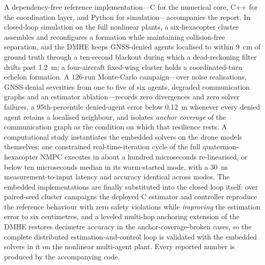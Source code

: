 A dependency-free reference implementation---C for the numerical core, C++ for
the coordination layer, and Python for simulation---accompanies the report. In
closed-loop simulation on the full nonlinear plants, a six-hexacopter cluster
assembles and reconfigures a formation while maintaining collision-free
separation, and the DMHE keeps GNSS-denied agents localised to within
\SI{9}{\centi\meter} of ground truth through a ten-second blackout during which a
dead-reckoning filter drifts past \SI{1.2}{\meter}; a four-aircraft fixed-wing
cluster holds a coordinated-turn echelon formation. A $126$-run Monte-Carlo
campaign---over noise realisations, GNSS-denial severities from one to five of
six agents, degraded communication graphs and an estimator ablation---records
zero divergences and zero solver failures, a 95th-percentile denied-agent error
below \SI{0.12}{\meter} whenever every denied agent retains a localised
neighbour, and isolates \emph{anchor coverage} of the communication graph as the
condition on which that resilience rests. A computational study instantiates the
embedded solvers on the drone models themselves: one constrained
real-time-iteration cycle of the full quaternion-hexacopter NMPC executes in
about a hundred microseconds re-linearised, or below ten microseconds median
in its warm-started mode, with a \SI{30}{\nano\second}
measurement-to-input latency and accuracy identical across modes. The embedded
implementations are finally substituted into the closed loop itself: over
paired-seed cluster campaigns the deployed C estimator and controller
reproduce the reference behaviour with zero safety violations while
\emph{improving} the estimation error to six centimetres, and a leveled
multi-hop anchoring extension of the DMHE restores decimetre accuracy in the
anchor-coverage-broken cases, so the complete distributed
estimation-and-control loop is validated with the embedded solvers in it on
the nonlinear multi-agent plant. Every reported number is produced by the
accompanying code.
